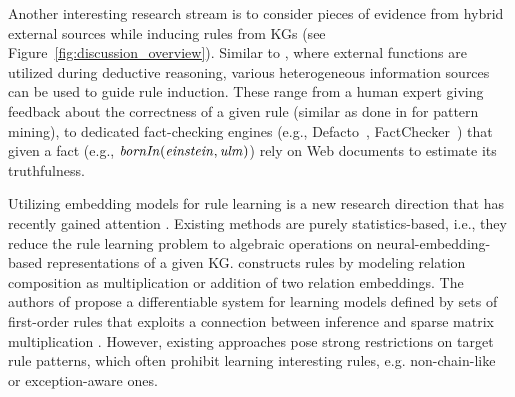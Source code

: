 Another interesting research stream is to consider pieces of evidence from hybrid external sources while inducing rules from KGs
(see Figure~\ref{fig:discussion_overview}). Similar to \cite{DBLP:conf/rweb/EiterKRSW17}, where external functions are utilized during deductive reasoning, various heterogeneous information sources can be used to guide rule induction. These range from a human expert giving feedback about the correctness of a given rule (similar as done in \cite{Dzyuba2017} for pattern mining), to dedicated fact-checking engines (e.g., Defacto~\cite{defacto}, FactChecker~\cite{factchecker}) that given a fact (e.g., $\mathit{bornIn(einstein,ulm)}$) rely on Web documents to estimate its truthfulness. 


 Utilizing embedding models for rule learning is a new research direction that has recently gained attention \cite{DBLP:conf/nips/YangYC17,DBLP:journals/corr/YangYHGD14a}. Existing methods are purely statistics-based, i.e., they reduce the rule learning problem to algebraic operations on neural-embedding-based representations of a given KG.  \cite{DBLP:journals/corr/YangYHGD14a} constructs rules by modeling relation composition as multiplication or addition of two relation embeddings. The authors of \cite{DBLP:conf/nips/YangYC17} propose a differentiable system for learning models defined by sets of first-order rules that exploits a connection between inference and sparse matrix multiplication \cite{DBLP:journals/corr/Cohen16b}. However, existing approaches pose strong restrictions on target rule patterns, which often prohibit learning interesting rules, e.g. non-chain-like or exception-aware ones.


